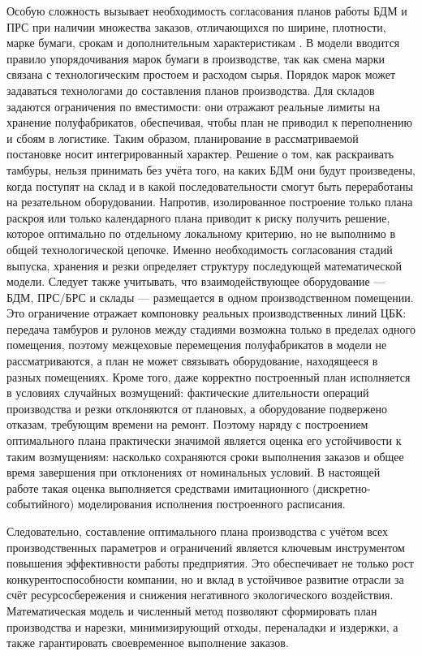 Особую сложность вызывает необходимость согласования планов работы БДМ и ПРС при наличии множества заказов, отличающихся по ширине, плотности, марке бумаги, срокам и дополнительным характеристикам \cite{keskinocak2002}.
В модели вводится правило упорядочивания марок бумаги в производстве, так как смена марки связана с технологическим простоем и расходом сырья.
Порядок марок может задаваться технологами до составления планов производства.
Для складов задаются ограничения по вместимости: они отражают реальные лимиты на хранение полуфабрикатов, обеспечивая, чтобы план не приводил к переполнению и сбоям в логистике.
Таким образом, планирование в рассматриваемой постановке носит интегрированный характер. Решение о том, как раскраивать тамбуры, нельзя принимать без учёта того, на каких БДМ они будут произведены, когда поступят на склад и в какой последовательности смогут быть переработаны на резательном оборудовании. Напротив, изолированное построение только плана раскроя или только календарного плана приводит к риску получить решение, которое оптимально по отдельному локальному критерию, но не выполнимо в общей технологической цепочке. Именно необходимость согласования стадий выпуска, хранения и резки определяет структуру последующей математической модели.
Следует также учитывать, что взаимодействующее оборудование --- БДМ, ПРС/БРС и склады --- размещается в одном производственном помещении. Это ограничение отражает компоновку реальных производственных линий ЦБК: передача тамбуров и рулонов между стадиями возможна только в пределах одного помещения, поэтому межцеховые перемещения полуфабрикатов в модели не рассматриваются, а план не может связывать оборудование, находящееся в разных помещениях.
Кроме того, даже корректно построенный план исполняется в условиях случайных возмущений: фактические длительности операций производства и резки отклоняются от плановых, а оборудование подвержено отказам, требующим времени на ремонт. Поэтому наряду с построением оптимального плана практически значимой является оценка его устойчивости к таким возмущениям: насколько сохраняются сроки выполнения заказов и общее время завершения при отклонениях от номинальных условий. В настоящей работе такая оценка выполняется средствами имитационного (дискретно-событийного) моделирования исполнения построенного расписания.

Следовательно, составление оптимального плана производства с учётом всех производственных параметров и ограничений является ключевым инструментом повышения эффективности работы предприятия.
Это обеспечивает не только рост конкурентоспособности компании, но и вклад в устойчивое развитие отрасли за счёт ресурсосбережения и снижения негативного экологического воздействия.
Математическая модель и численный метод позволяют сформировать план производства и нарезки, минимизирующий отходы, переналадки и издержки, а также гарантировать своевременное выполнение заказов.

